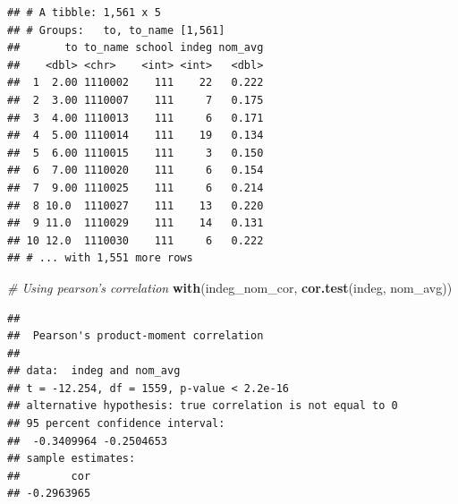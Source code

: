 \documentclass[]{book}
\newenvironment{Shaded}{\begin{snugshade}}{\end{snugshade}}
\newcommand{\KeywordTok}[1]{\textcolor[rgb]{0.13,0.29,0.53}{\textbf{#1}}}
\newcommand{\DataTypeTok}[1]{\textcolor[rgb]{0.13,0.29,0.53}{#1}}
\newcommand{\DecValTok}[1]{\textcolor[rgb]{0.00,0.00,0.81}{#1}}
\newcommand{\StringTok}[1]{\textcolor[rgb]{0.31,0.60,0.02}{#1}}
\newcommand{\CommentTok}[1]{\textcolor[rgb]{0.56,0.35,0.01}{\textit{#1}}}
\newcommand{\OperatorTok}[1]{\textcolor[rgb]{0.81,0.36,0.00}{\textbf{#1}}}
\newcommand{\NormalTok}[1]{#1}
\theoremstyle{definition}
\theoremstyle{definition}
\theoremstyle{definition}
\theoremstyle{remark}
\begin{document}
\begin{Shaded}
\end{Shaded}

\begin{verbatim}
## # A tibble: 1,561 x 5
## # Groups:   to, to_name [1,561]
##       to to_name school indeg nom_avg
##    <dbl> <chr>    <int> <int>   <dbl>
##  1  2.00 1110002    111    22   0.222
##  2  3.00 1110007    111     7   0.175
##  3  4.00 1110013    111     6   0.171
##  4  5.00 1110014    111    19   0.134
##  5  6.00 1110015    111     3   0.150
##  6  7.00 1110020    111     6   0.154
##  7  9.00 1110025    111     6   0.214
##  8 10.0  1110027    111    13   0.220
##  9 11.0  1110029    111    14   0.131
## 10 12.0  1110030    111     6   0.222
## # ... with 1,551 more rows
\end{verbatim}

\begin{Shaded}
\begin{Highlighting}[]
\CommentTok{# Using pearson's correlation}
\KeywordTok{with}\NormalTok{(indeg_nom_cor, }\KeywordTok{cor.test}\NormalTok{(indeg, nom_avg))}
\end{Highlighting}
\end{Shaded}

\begin{verbatim}
## 
##  Pearson's product-moment correlation
## 
## data:  indeg and nom_avg
## t = -12.254, df = 1559, p-value < 2.2e-16
## alternative hypothesis: true correlation is not equal to 0
## 95 percent confidence interval:
##  -0.3409964 -0.2504653
## sample estimates:
##        cor 
## -0.2963965
\end{verbatim}
\end{document}
